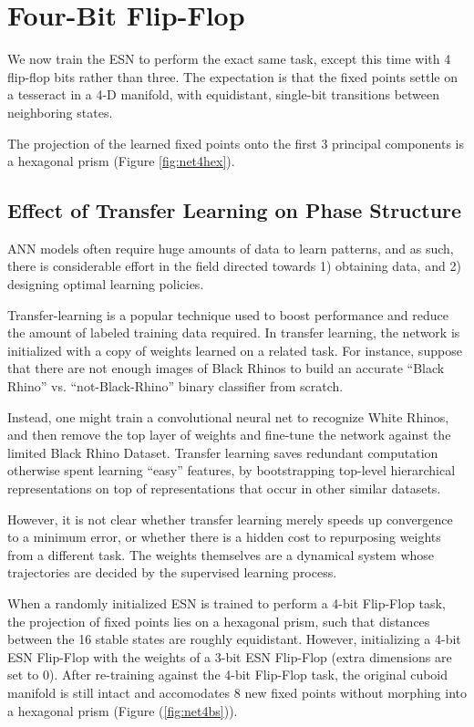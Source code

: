 \documentclass{article} %
\begin{document}
\section{Four-Bit Flip-Flop}

We now train the ESN to perform the exact same task, except this time with 4 flip-flop bits rather than three. The expectation is that the fixed points settle on a tesseract in a 4-D manifold, with equidistant, single-bit transitions between neighboring states.

The projection of the learned fixed points onto the first 3 principal components is a hexagonal prism (Figure \ref{fig:net4hex}).

\subsection{Effect of Transfer Learning on Phase Structure}

ANN models often require huge amounts of data to learn patterns, and as such, there is considerable effort in the field directed towards 1) obtaining data, and 2) designing optimal learning policies.

Transfer-learning is a popular technique used to boost performance and reduce the amount of labeled training data required. In transfer learning, the network is initialized with a copy of weights learned on a related task. For instance, suppose that there are not enough images of Black Rhinos to build an accurate ``Black Rhino'' vs. ``not-Black-Rhino'' binary classifier from scratch.

Instead, one might train a convolutional neural net to recognize White Rhinos, and then remove the top layer of weights and fine-tune the network against the limited Black Rhino Dataset. Transfer learning saves redundant computation otherwise spent learning ``easy'' features, by bootstrapping top-level hierarchical representations on top of representations that occur in other similar datasets.

However, it is not clear whether transfer learning merely speeds up convergence to a minimum error, or whether there is a hidden cost to repurposing weights from a different task. The weights themselves are a dynamical system whose trajectories are decided by the supervised learning process.

When a randomly initialized ESN is trained to perform a 4-bit Flip-Flop task, the projection of fixed points lies on a hexagonal prism, such that distances between the 16 stable states are roughly equidistant. However, initializing a 4-bit ESN Flip-Flop with the weights of a 3-bit ESN Flip-Flop (extra dimensions are set to 0). After re-training against the 4-bit Flip-Flop task, the original cuboid manifold is still intact and accomodates 8 new fixed points without morphing into a hexagonal prism (Figure (\ref{fig:net4bs})).
\end{document}

